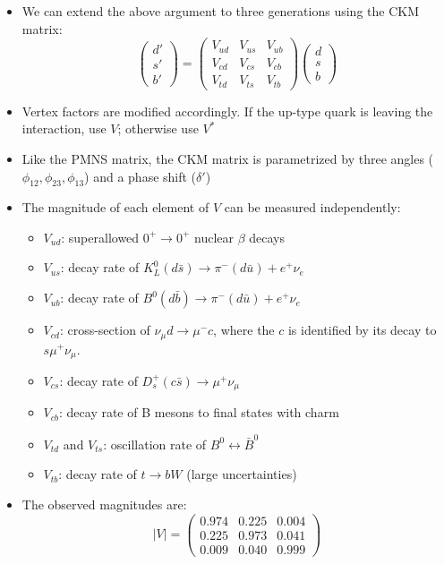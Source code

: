 \documentclass[11pt]{article}
\newcommand{\ubar}{\bar{u}}
\newcommand{\sbar}{\bar{s}}
\newcommand{\bbar}{\bar{b}}
\newcommand{\pos}{\ensuremath{e^{+}}\xspace}
\begin{document}
  \begin{itemize}
    \item We can extend the above argument to three generations using the CKM matrix:
    \begin{equation}
      \begin{pmatrix} d' \\ s' \\ b' \end{pmatrix} = 
      \begin{pmatrix} V_{ud} & V_{us} & V_{ub}\\
      V_{cd} & V_{cs} & V_{cb}\\
      V_{td} & V_{ts} & V_{tb} \end{pmatrix}
      \begin{pmatrix} d \\ s \\ b \end{pmatrix}
    \end{equation}
    \item Vertex factors are modified accordingly. If the up-type quark is leaving the interaction, use $V$; otherwise use $V^*$
    \item Like the PMNS matrix, the CKM matrix is parametrized by three angles ($\phi_{12},\phi_{23},\phi_{13}$) and a phase shift ($\delta'$)
    \item The magnitude of each element of $V$ can be measured independently:
    \begin{itemize}
      \item $V_{ud}$: superallowed $0^+\rightarrow 0^+$ nuclear $\beta$ decays
      \item $V_{us}$: decay rate of $K_L^0(d\sbar) \rightarrow \pi^-(d\ubar) + \pos\nu_e$
      \item $V_{ub}$: decay rate of $B^0(d\bbar)\rightarrow  \pi^-(d\ubar) + \pos\nu_e$
      \item $V_{cd}$: cross-section of $\nu_\mu d \rightarrow \mu^- c$, where the $c$ is identified by its decay to $s \mu^+ \nu_\mu$.
      \item $V_{cs}$: decay rate of $D^+_s(c\sbar)\rightarrow \mu^+\nu_\mu$
      \item $V_{cb}$: decay rate of B mesons to final states with charm
      \item $V_{td}$ and $V_{ts}$: oscillation rate of $B^0\leftrightarrow \bar B^0$ 
      \item $V_{tb}$: decay rate of $t\rightarrow bW$ (large uncertainties)
    \end{itemize}
    \item The observed magnitudes are:
    \begin{equation}
      |V| = \begin{pmatrix} 0.974 & 0.225 & 0.004\\
      0.225 & 0.973 & 0.041\\
      0.009 & 0.040 & 0.999 \end{pmatrix}
    \end{equation}
  \end{itemize}
\end{document}
